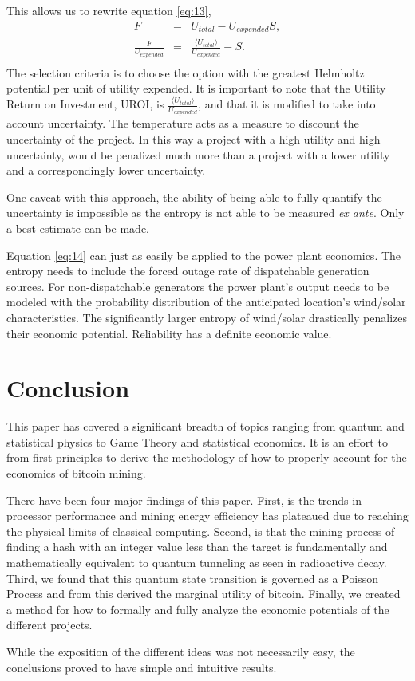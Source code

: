 \documentclass[runningheads]{llncs}
\begin{document}
This allows us to rewrite equation \ref{eq:13},
\begin{eqnarray}
    F &=& U_{total} - U_{expended} S, \\
    \frac{F}{U_{expended}} &=& \frac{\langle U_{total}\rangle}{U_{expended}} - S. \label{eq:14}\\
\end{eqnarray}
The selection criteria is to choose the option with the greatest Helmholtz potential per unit of utility expended.
It is important to note that the Utility Return on Investment, UROI, is $\frac{\langle U_{total}\rangle}{U_{expended}}$, and that it is modified to take into account uncertainty.
The temperature acts as a measure to discount the uncertainty of the project.
In this way a project with a high utility and high uncertainty, would be penalized much more than a project with a lower utility and a correspondingly lower uncertainty.

One caveat with this approach, the ability of being able to fully quantify the uncertainty is impossible as the entropy is not able to be measured \emph{ex ante}.
Only a best estimate can be made.

Equation \ref{eq:14} can just as easily be applied to the power plant economics.
The entropy needs to include the forced outage rate of dispatchable generation sources.
For non-dispatchable generators the power plant's output needs to be modeled with the probability distribution of the anticipated location's wind/solar characteristics.
The significantly larger entropy of wind/solar drastically penalizes their economic potential.
Reliability has a definite economic value.

\section{Conclusion}

This paper has covered a significant breadth of topics ranging from quantum and statistical physics to Game Theory and statistical economics.
It is an effort to from first principles to derive the methodology of how to properly account for the economics of bitcoin mining.

There have been four major findings of this paper.
First, is the trends in processor performance and mining energy efficiency has plateaued due to reaching the physical limits of classical computing.
Second, is that the mining process of finding a hash with an integer value less than the target is fundamentally and mathematically equivalent to quantum tunneling as seen in radioactive decay.
Third, we found that this quantum state transition is governed as a Poisson Process and from this derived the marginal utility of bitcoin.
Finally, we created a method for how to formally and fully analyze the economic potentials of the different projects.

While the exposition of the different ideas was not necessarily easy, the conclusions proved to have simple and intuitive results.


%
%


\end{document}
